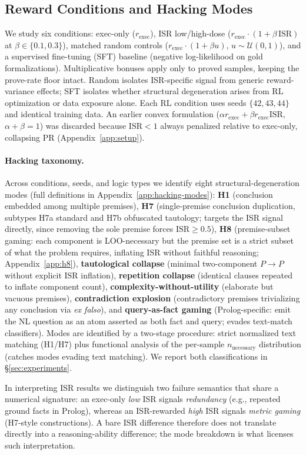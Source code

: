 \subsection{Reward Conditions and Hacking Modes}
\label{sec:rewards}
\label{sec:taxonomy-method}

We study six conditions: exec-only ($r_{\text{exec}}$), ISR low/high-dose ($r_{\text{exec}}\cdot(1{+}\beta\,\text{ISR})$ at $\beta\in\{0.1,0.3\}$), matched random controls ($r_{\text{exec}}\cdot(1{+}\beta u)$, $u\sim\mathcal{U}(0,1)$), and a supervised fine-tuning (SFT) baseline (negative log-likelihood on gold formalizations).
Multiplicative bonuses apply only to proved samples, keeping the prove-rate floor intact.
Random isolates ISR-specific signal from generic reward-variance effects; SFT isolates whether structural degeneration arises from RL optimization or data exposure alone.
Each RL condition uses seeds $\{42,43,44\}$ and identical training data.
An earlier convex formulation ($\alpha r_{\text{exec}} + \beta r_{\text{exec}}\text{ISR}$, $\alpha{+}\beta{=}1$) was discarded because $\text{ISR}{<}1$ always penalized relative to exec-only, collapsing PR (Appendix~\ref{app:setup}).

\paragraph{Hacking taxonomy.}
Across conditions, seeds, and logic types we identify eight structural-degeneration modes (full definitions in Appendix~\ref{app:hacking-modes}):
\textbf{H1} (conclusion embedded among multiple premises),
\textbf{H7} (single-premise conclusion duplication, subtypes H7a standard and H7b obfuscated tautology; targets the ISR signal directly, since removing the sole premise forces $\text{ISR}\geq 0.5$),
\textbf{H8} (premise-subset gaming: each component is LOO-necessary but the premise set is a strict subset of what the problem requires, inflating ISR without faithful reasoning; Appendix~\ref{app:h8}),
\textbf{tautological collapse} (minimal two-component $P{\to}P$ without explicit ISR inflation),
\textbf{repetition collapse} (identical clauses repeated to inflate component count),
\textbf{complexity-without-utility} (elaborate but vacuous premises),
\textbf{contradiction explosion} (contradictory premises trivializing any conclusion via \emph{ex falso}), and
\textbf{query-as-fact gaming} (Prolog-specific: emit the NL question as an atom asserted as both fact and query; evades text-match classifiers).
Modes are identified by a two-stage procedure: strict normalized text matching (H1/H7) plus functional analysis of the per-sample $n_{\text{necessary}}$ distribution (catches modes evading text matching).
We report both classifications in \S\ref{sec:experiments}.

In interpreting ISR results we distinguish two failure semantics that share a numerical signature: an exec-only \emph{low} ISR signals \emph{redundancy} (e.g., repeated ground facts in Prolog), whereas an ISR-rewarded \emph{high} ISR signals \emph{metric gaming} (H7-style constructions).
A bare ISR difference therefore does not translate directly into a reasoning-ability difference; the mode breakdown is what licenses such interpretation.
